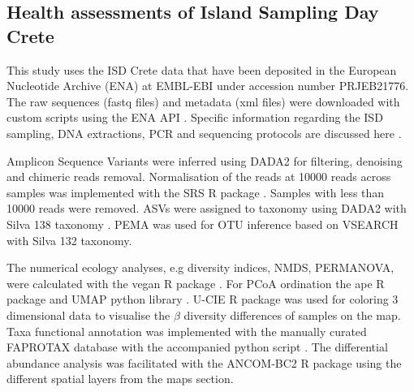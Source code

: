 \documentclass[a4paper,12pt]{article}
\begin{document}
\subsection{Health assessments of Island Sampling Day Crete}\label{isd_data}

This study uses the ISD Crete data that have been deposited
in the European Nucleotide Archive (ENA) at EMBL-EBI under accession number PRJEB21776.
The raw sequences (fastq files) and metadata (xml files) were downloaded with custom scripts using the ENA API \parencite{ocathail2024the-european}.
Specific information regarding the ISD sampling, DNA extractions, PCR and sequencing
protocols are discussed here \parencite{holm2025first}.

Amplicon Sequence Variants were inferred using DADA2 \parencite{Callahan2016} for 
filtering, denoising and chimeric reads removal. Normalisation of the reads at 10000 reads
across samples was implemented with the SRS R package \parencite{Beule2020}. Samples
with less than 10000 reads were removed. ASVs were assigned to taxonomy using 
DADA2 with Silva 138 taxonomy \parencite{quast_silva_2013}.
PEMA was used for OTU inference based on VSEARCH \parencite{zafeiropoulos2020pema} with Silva 132 taxonomy.

The numerical ecology analyses, e.g diversity indices, NMDS, PERMANOVA, were calculated
with the vegan R package \parencite{oksanen2024vegan}.
For PCoA ordination the ape R package \parencite{Paradis2004} and UMAP python library \parencite{mcinnes2018umap-software}.
U-CIE R package was used for coloring 3 dimensional data \parencite{Koutrouli2022} to 
visualise the $\beta$ diversity differences of samples on the map.
Taxa functional annotation was implemented with the manually curated FAPROTAX database
with the accompanied python script \parencite{loucaDecouplingFunctionTaxonomy2016}.
The differential abundance analysis was facilitated with the ANCOM-BC2 R package \parencite{Lin2023} using the 
different spatial layers from the maps section.
\end{document}
